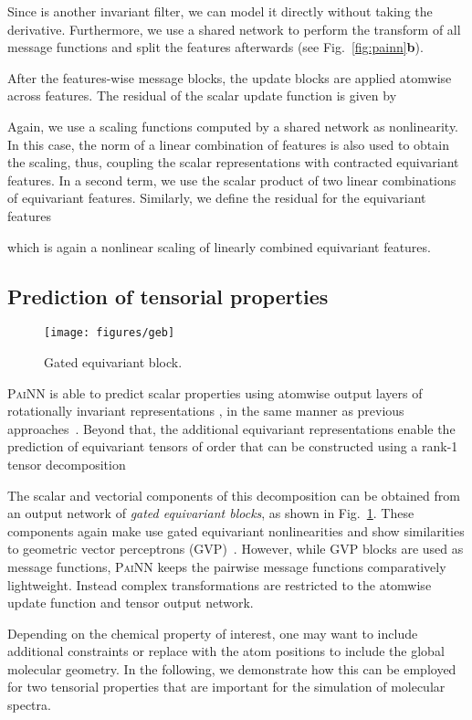 \documentclass[reprint,
amsmath,amssymb,
 aip,jcp
]{revtex4-2}
\newcommand{\painn}{\textsc{PaiNN}}
\newcommand{\new}[1]{#1}
\begin{document}
Since  is another invariant filter, we can model it directly without taking the derivative.
Furthermore, we use a shared network  to perform the transform of all message functions and split the features afterwards (see Fig.~\ref{fig:painn}\textbf{b}).

After the features-wise message blocks, the update blocks are applied atomwise across features.
The residual of the scalar update function is given by

Again, we use a scaling functions computed by a shared network  as nonlinearity.
In this case, the norm of a linear combination of features is also used to obtain the scaling, thus, coupling the scalar representations with contracted equivariant features.
In a second term, we use the scalar product of two linear combinations of equivariant features.
Similarly, we define the residual for the equivariant features

which is again a nonlinear scaling of linearly combined equivariant features.

\subsection{Prediction of tensorial properties}\label{sec:tensprop}
\begin{figure}[tb]
\centering
\texttt{[image: figures/geb]}
\caption{Gated equivariant block.\label{fig:geb}}
\end{figure}

\painn{} is able to predict scalar properties using atomwise output layers of rotationally invariant representations , in the same manner as previous approaches~\cite{schutt2017deep,unke2019physnet}.
Beyond that, the additional equivariant representations enable the prediction of equivariant tensors of order  that can be constructed using a rank-1 tensor decomposition

The scalar and vectorial components of this decomposition can be obtained from an output network of \emph{gated equivariant blocks}, as shown in Fig.~\ref{fig:geb}.
\new{These components again make use gated equivariant nonlinearities \cite{weiler2018learning} and show similarities to geometric vector perceptrons (GVP)~\cite{jing2021learning}.
However, while GVP blocks are used as message functions, \painn{} keeps the pairwise message functions comparatively lightweight.
Instead complex transformations are restricted to the atomwise update function and tensor output network.}

Depending on the chemical property of interest, one may want to include additional constraints or replace  with the atom positions to include the global molecular geometry.
In the following, we demonstrate how this can be employed for two tensorial properties that are important for the simulation of molecular spectra.
\end{document}
